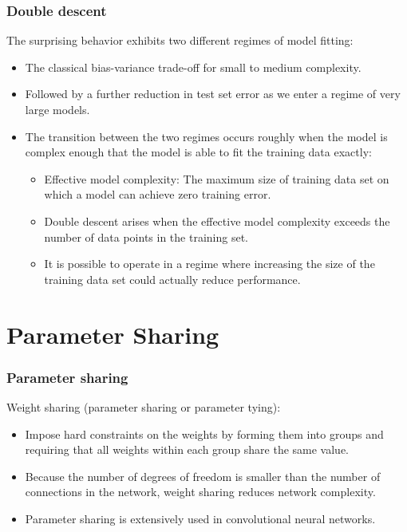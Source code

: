 \documentclass{beamer}
\begin{document}
\begin{frame}
    \frametitle{Double descent}
    The surprising behavior exhibits two different regimes of model fitting:
    \begin{itemize}
        \item The classical bias-variance trade-off for small to medium complexity.
        \item Followed by a further reduction in test set error as we enter a regime of very large models.
        \item The transition between the two regimes occurs roughly when the model is complex enough that the model is able to fit the training data exactly:
        \begin{itemize}
            \item Effective model complexity: The maximum size of training data set on which a model can achieve zero training error.
            \item Double descent arises when the effective model complexity exceeds the number of data points in the training set.
            \item It is possible to operate in a regime where increasing the size of the training data set could actually reduce performance.
        \end{itemize}
    \end{itemize}
\end{frame}

\section{Parameter Sharing}

\begin{frame}
    \frametitle{Parameter sharing}
    Weight sharing (parameter sharing or parameter tying):
    \begin{itemize}
        \item Impose hard constraints on the weights by forming them into groups and requiring that all weights within each group share the same value.
        \item Because the number of degrees of freedom is smaller than the number of connections in the network, weight sharing reduces network complexity.
        \item Parameter sharing is extensively used in convolutional neural networks.
    \end{itemize}
\end{frame}
\end{document}
